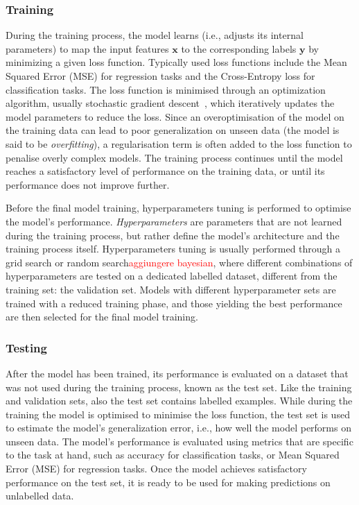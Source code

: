 \subsubsection{Training}
During the training process, the model learns (i.e., adjusts its internal parameters) to map the input features $\mathbf{x}$ to the corresponding labels $\mathbf{y}$ by minimizing a given loss function. Typically used loss functions include the Mean Squared Error (MSE) for regression tasks and the Cross-Entropy loss for classification tasks. The loss function is minimised through an optimization algorithm, usually stochastic gradient descent~\cite{10.1214/aoms/1177729392}, which iteratively updates the model parameters to reduce the loss. Since an overoptimisation of the model on the training data can lead to poor generalization on unseen data (the model is said to be \emph{overfitting}), a regularisation term is often added to the loss function to penalise overly complex models. The training process continues until the model reaches a satisfactory level of performance on the training data, or until its performance does not improve further. 

Before the final model training, hyperparameters tuning is performed to optimise the model's performance. \emph{Hyperparameters} are parameters that are not learned during the training process, but rather define the model's architecture and the training process itself. Hyperparameters tuning is usually performed through a grid search or random search\textcolor{red}{aggiungere bayesian}, where different combinations of hyperparameters are tested on a dedicated labelled dataset, different from the training set: the validation set. Models with different hyperparameter sets are trained with a reduced training phase, and those yielding the best performance are then selected for the final model training.

\subsubsection{Testing}
After the model has been trained, its performance is evaluated on a dataset that was not used during the training process, known as the test set. Like the training and validation sets, also the test set contains labelled examples. While during the training the model is optimised to minimise the loss function, the test set is used to estimate the model's generalization error, i.e., how well the model performs on unseen data. The model's performance is evaluated using metrics that are specific to the task at hand, such as accuracy for classification tasks, or Mean Squared Error (MSE) for regression tasks. Once the model achieves satisfactory performance on the test set, it is ready to be used for making predictions on unlabelled data.

